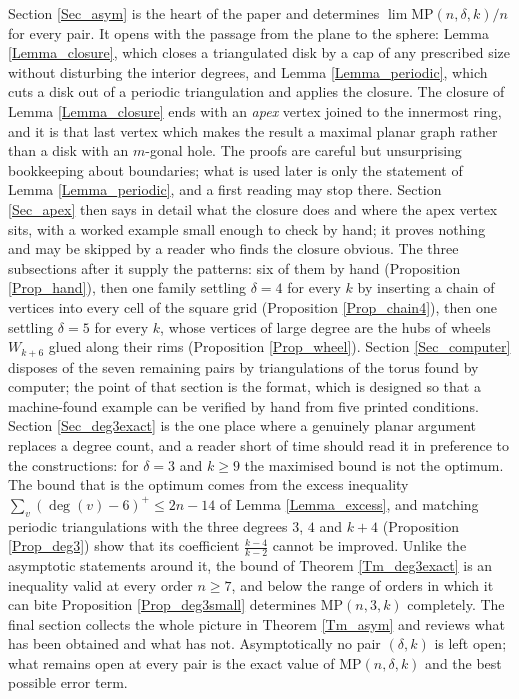 \documentclass[10pt,a4paper]{article}
\begin{document}
Section \ref{Sec_asym} is the heart of the paper and determines $\lim \mathrm{MP}(n,\delta ,k)/n$ for
every pair. It opens with the passage from the plane to the sphere: Lemma \ref{Lemma_closure}, which
closes a triangulated disk by a cap of any prescribed size without disturbing the interior degrees, and Lemma \ref{Lemma_periodic}, which cuts a disk out of a periodic triangulation and applies the closure.
The closure of Lemma \ref{Lemma_closure} ends with an \emph{apex} vertex joined to the innermost ring, and it
is that last vertex which makes the result a maximal planar graph rather than a
disk with an $m$-gonal hole.
The proofs are careful but unsurprising bookkeeping about boundaries; what is used later is only the
statement of Lemma \ref{Lemma_periodic}, and a first reading may stop there. Section \ref{Sec_apex} then
says in detail what the closure does and where the apex vertex sits, with a worked example small enough
to check by hand; it proves nothing and may be skipped by a reader who finds the closure obvious. The
three subsections after it supply the patterns: six of them by hand (Proposition \ref{Prop_hand}), then one family
settling $\delta =4$ for every $k$ by inserting a chain of vertices into every cell of the square grid
(Proposition \ref{Prop_chain4}), then one settling $\delta =5$ for every $k$, whose vertices of large
degree are the hubs of wheels $W_{k+6}$ glued along their rims (Proposition \ref{Prop_wheel}). Section
\ref{Sec_computer} disposes of the seven remaining pairs by triangulations of the torus found by
computer; the point of that section is the format, which is designed so that a machine-found example can
be verified by hand from five printed conditions. Section \ref{Sec_deg3exact} is the one place where a
genuinely planar argument replaces a degree count, and a reader short of time should read it in
preference to the constructions: for $\delta =3$ and $k\geq 9$ the maximised bound is not the optimum. The
bound that is the optimum comes from the excess inequality $\sum_{v}(\deg (v)-6)^{+}\leq 2n-14$ of Lemma
\ref{Lemma_excess}, and matching
periodic triangulations with the three degrees $3$, $4$ and $k+4$ (Proposition \ref{Prop_deg3}) show
that its coefficient $\frac{k-4}{k-2}$ cannot be improved. Unlike the asymptotic statements around it,
the bound of Theorem \ref{Tm_deg3exact} is an inequality valid at every order $n\geq 7$, and below the
range of orders in which it can bite Proposition \ref{Prop_deg3small} determines
$\mathrm{MP}(n,3,k)$ completely. 
The final section collects the whole picture in Theorem \ref{Tm_asym} and reviews what has been obtained and what has not. Asymptotically no pair
$(\delta ,k)$ is left open; what remains open at every pair is the exact value of
$\mathrm{MP}(n,\delta ,k)$ and the best possible error term.
\end{document}
